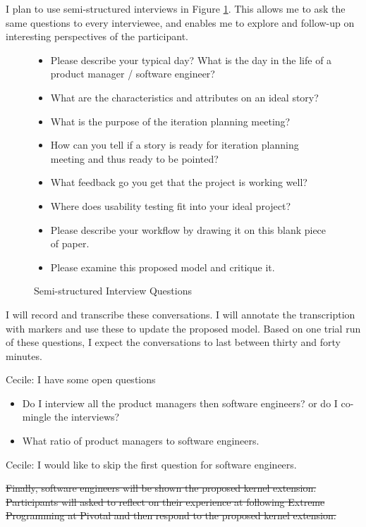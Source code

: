 \documentclass[preprint,12pt,3p]{elsarticle}
\begin{document}
I plan to use semi-structured interviews in Figure \ref{InterviewQuestions}. This allows me to ask the same questions to every interviewee, and enables me to explore and follow-up on interesting perspectives of the participant.

\begin{figure}[h]\vspace*{4pt}
\caption{Semi-structured Interview Questions}\vspace*{-6pt}\label{InterviewQuestions}
\begin{itemize}
\item Please describe your typical day? What is the day in the life of a product manager / software engineer?
\item What are the characteristics and attributes on an ideal story?
\item What is the purpose of the iteration planning meeting?
\item How can you tell if a story is ready for iteration planning meeting and thus ready to be pointed?
\item What feedback go you get that the project is working well?
\item Where does usability testing fit into your ideal project?
\item Please describe your workflow by drawing it on this blank piece of paper.
\item Please examine this proposed model and critique it.
\end{itemize}
\end{figure}

I will record and transcribe these conversations. I will annotate the transcription with markers and use these to update the proposed model. Based on one trial run of these questions, I expect the conversations to last between thirty and forty minutes. 

Cecile: I have some open questions
\begin{itemize}
\item Do I interview all the product managers then software engineers? or do I co-mingle the interviews?
\item What ratio of product managers to software engineers.
\end{itemize}

Cecile: I would like to skip the first question for software engineers.

\sout{Finally, software engineers will be shown the proposed kernel extension. Participants will asked to reflect on their experience at following Extreme Programming at Pivotal and then respond to the proposed kernel extension.}
\end{document}
